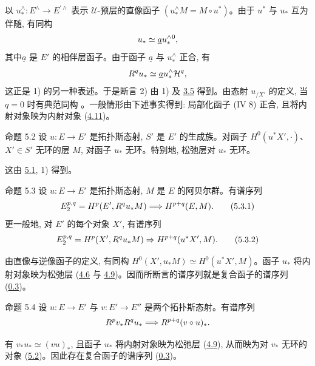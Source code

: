 以 $u^{\wedge}_\ast:E^{\wedge}\to E^{\prime\wedge}$ 表示 $𝒰$-预层的直像函子 $(u^{\wedge}_\ast M=M\circ u^\ast)$。由于 $u^\ast$ 与 $u_\ast$ 互为伴随, 有同构
$$
u_\ast\simeq\underline{a}u^{\wedge}_\ast{}^{0}{},
$$
其中\pageoriginale $\underline{a}$ 是 $E'$ 的相伴层函子。由于函子 $\underline{a}$ 与 $u^{\wedge}_\ast$ 正合, 有
$$
R^qu_\ast\simeq\underline{a}u^{\wedge}_\ast{\mathcal H}^q{},
$$
这正是 1) 的另一种表述。于是断言 2) 由 1) 及 \hyperref[V.cor3.5]{3.5} 得到。由态射 $u_{/X'}$ 的定义, 当 $q=0$ 时有典范同构 。一般情形由下述事实得到: 局部化函子 (IV 8) 正合, 且将内射对象映为内射对象 (\hyperref[V.prop4.11]{4.11})。

\begin{enonce*}{命题 5.2}
设 $u:E\to E'$ 是拓扑斯态射, $S'$ 是 $E'$ 的生成族。对函子 $H^0(u^\ast X',\mathord\cdot)$、$X'\in S'$ 无环的层 $M$, 对函子 $u_\ast$ 无环。特别地, 松弛层对 $u_\ast$ 无环。
\end{enonce*}

这由 \hyperref[V.prop5.1]{5.1}, 1) 得到。

\begin{enonce*}{命题 5.3}
设 $u:E\to E'$ 是拓扑斯态射, $M$ 是 $E$ 的阿贝尔群。有谱序列
\begin{equation*}
E^{p,q}_2=H^p(E',R^qu_\ast M)\Longrightarrow H^{p+q}(E,M){}.
\tag{5.3.1}
\end{equation*}
更一般地, 对 $E'$ 的每个对象 $X'$, 有谱序列
\begin{equation}
E^{p,q}_2=H^p(X',R^qu_\ast M)\Rightarrow H^{p+q}(u^\ast X',M){}.
\tag{5.3.2}
\end{equation}
\end{enonce*}

由直像与逆像函子的定义, 有同构 $H^0(X',u_\ast M)\simeq H^0(u^\ast X',M)$。函子 $u_\ast$ 将内射对象映为松弛层 (\hyperref[V.subsec4.6]{4.6} 与 \hyperref[V.prop4.9]{4.9})。因而所断言的谱序列就是复合函子的谱序列 (\hyperref[V.prop0.3]{0.3})。

\begin{enonce*}{命题 5.4}
设 $u:E\to E'$ 与 $v:E'\to E''$ 是两个拓扑斯态射。有谱序列
$$
R^pv_\ast R^qu_\ast\Longrightarrow R^{p+q}(v\circ u)_\ast{}.
$$
\end{enonce*}

有 $v_\ast u_\ast\simeq(vu)_\ast$, 且函子 $u_\ast$ 将内射对象映为\pageoriginale 松弛层 (\hyperref[V.prop4.9]{4.9}), 从而映为对 $v_\ast$ 无环的对象 (\hyperref[V.prop5.2]{5.2})。因此存在复合函子的谱序列 (\hyperref[V.prop0.3]{0.3})。

